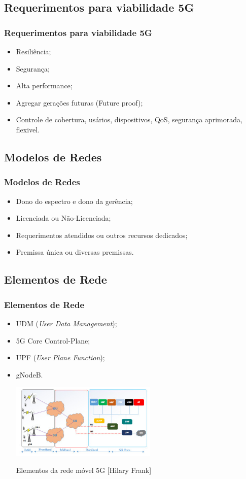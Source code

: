 \documentclass[t]{beamer}
\begin{document}
\subsection{Requerimentos para viabilidade 5G}
\begin{frame}
	\frametitle{Requerimentos para viabilidade 5G}
	\begin{itemize}
		\item Resiliência;
		\item Segurança;
		\item Alta performance;
		\item Agregar gerações futuras (Future proof);
		\item Controle de cobertura, usários, dispositivos, QoS, segurança aprimorada, flexivel.
	\end{itemize}
\end{frame}

\subsection{Modelos de Redes}
\begin{frame}
	\frametitle{Modelos de Redes}
	\begin{itemize}
		\item Dono do espectro e dono da gerência;
		\item Licenciada ou Não-Licenciada;
		\item Requerimentos atendidos ou outros recursos dedicados;
		\item Premissa única ou diversas premissas.
	\end{itemize}
\end{frame}

\subsection{Elementos de Rede}
\begin{frame}
	\frametitle{Elementos de Rede}
	\begin{itemize}
		\item UDM (\textit{User Data Management});
		\item 5G Core Control-Plane;
		\item UPF (\textit{User Plane Function});
		\item gNodeB.\\
		\begin{center}
				\includegraphics[width=7cm]{5g.jpg}\\
				\centering
				\caption{\tiny Elementos da rede móvel 5G [Hilary Frank] }
		\end{center}
	\end{itemize}
\end{frame}
\end{document}
